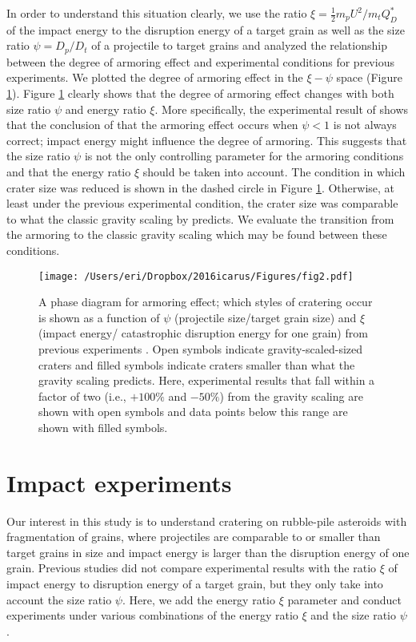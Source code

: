 \documentclass[3p,authoryear]{elsarticle}
\begin{document}
In order to understand this situation clearly, we use the ratio $\xi =\frac{1}{2}m_pU^2/m_tQ_D^*$ of the impact energy to the disruption energy of a target grain as well as the size ratio $\psi=D_p/D_t$ of a projectile to target grains and analyzed the relationship between the degree of armoring effect and experimental conditions for previous experiments. We plotted the degree of armoring effect in the $\xi - \psi$ space (Figure \ref{phase}). Figure \ref{phase} clearly shows that the degree of armoring effect changes with both size ratio $\psi$ and energy ratio $\xi$.
More specifically, the experimental result of \citet{holsapple2014} shows that the conclusion of \citet{guettler2012} that the armoring effect occurs when $\psi<1$ is not always correct; impact energy might influence the degree of armoring.
This suggests that the size ratio $\psi$ is not the only controlling parameter for the armoring conditions and that the energy ratio $\xi$ should be taken into account.
The condition in which crater size was reduced is shown in the dashed circle in Figure \ref{phase}. Otherwise, at least under the previous experimental condition, the crater size was comparable to what the classic gravity scaling by \citet{holsapple1993} predicts.
We evaluate the transition from the armoring to the classic gravity scaling which may be found between these conditions.
\begin{figure}[htbp]
\begin{center}
	\texttt{[image: /Users/eri/Dropbox/2016icarus/Figures/fig2.pdf]}
	\caption{A phase diagram for armoring effect; which styles of cratering occur is shown as a function of $\psi$ (projectile size/target grain size) and $\xi$ (impact energy/ catastrophic disruption energy for one grain) from previous experiments \citep{cintala1999,guettler2012,holsapple2014}. Open symbols indicate gravity-scaled-sized craters \citep{holsapple1993} and filled symbols indicate craters smaller than what the gravity scaling predicts. Here, experimental results that fall within a factor of two (i.e., $+100\%$ and $-50\%$) from the gravity scaling are shown with open symbols and data points below this range are shown with filled symbols.}
	\label{phase}
\end{center}
\end{figure}

 \section{Impact experiments} \label{sec:experiment}
Our interest in this study is to understand cratering on rubble-pile asteroids with fragmentation of grains, where projectiles are comparable to or smaller than target grains in size and impact energy is larger than the disruption energy of one grain.
Previous studies did not compare experimental results with the ratio $\xi$ of impact energy to disruption energy of a target grain, but they only take into account the size ratio $\psi$.
Here, we add the energy ratio $\xi$ parameter and conduct experiments under various combinations of the energy ratio $\xi$ and the size ratio $\psi$.
\end{document}
